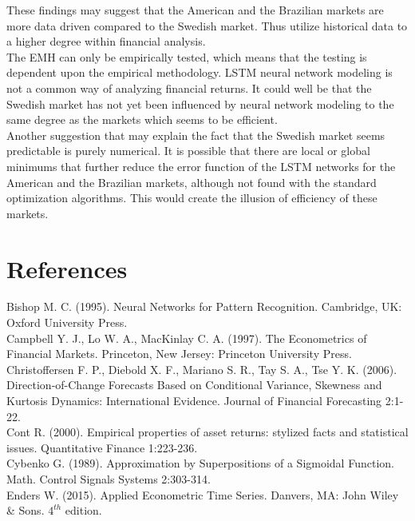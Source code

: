 \documentclass[12pt, letterpaper]{amsart}%
\begin{document}
These findings may suggest that the American and the Brazilian markets are more data driven compared to the Swedish market. Thus utilize historical data to a higher degree within financial analysis.
\\

The EMH can only be empirically tested, which means that the testing is dependent upon the empirical methodology. LSTM neural network modeling is not a common way of analyzing financial returns. It could well be that the Swedish market has not yet been influenced by neural network modeling to the same degree as the markets which seems to be efficient.
\\

Another suggestion that may explain the fact that the Swedish market seems predictable is purely numerical. It is possible that there are local or global minimums that further reduce the error function of the LSTM networks for the American and the Brazilian markets, although not found with the standard optimization algorithms. This would create the illusion of efficiency of these markets.

\newpage

\section{References}
Bishop M. C. (1995). Neural Networks for Pattern Recognition. Cambridge, UK: Oxford University Press.
\\

Campbell Y. J., Lo W. A., MacKinlay C. A. (1997). The Econometrics of Financial Markets. Princeton, New Jersey: Princeton University Press.
\\

Christoffersen F. P., Diebold X. F., Mariano S. R., Tay S. A., Tse Y. K. (2006). Direction-of-Change Forecasts Based on Conditional Variance, Skewness and Kurtosis Dynamics: International Evidence. Journal of Financial Forecasting 2:1-22.
\\

Cont R. (2000). Empirical properties of asset returns: stylized facts and statistical issues. Quantitative Finance 1:223-236.
\\

Cybenko G. (1989). Approximation by Superpositions of a Sigmoidal Function. Math. Control Signals Systems 2:303-314.
\\

Enders W. (2015). Applied Econometric Time Series. Danvers, MA: John Wiley \& Sons. $4^{th}$ edition.
\\
\end{document}
